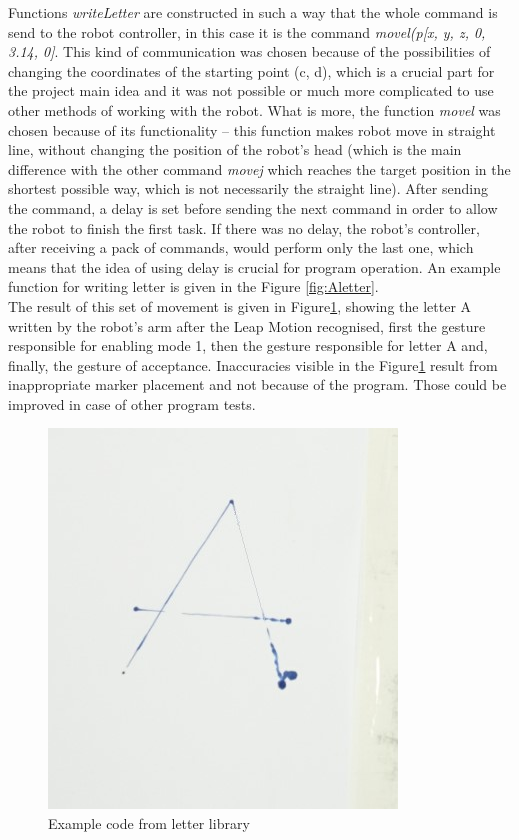Functions \textit{writeLetter} are constructed in such a way that the whole command is send to the robot controller, in this case it is the command \textit{movel(p[x, y, z, 0, 3.14, 0]}. This kind of communication was chosen because of the possibilities of changing the coordinates of the starting point (c, d), which is a crucial part for the project main idea and it was not possible or much more complicated to use other methods of working with the robot. What is more, the function \textit{movel} was chosen because of its functionality – this function makes robot move in straight line, without changing the position of the robot’s head (which is the main difference with the other command \textit{movej} which reaches the target position in the shortest possible way, which is not necessarily the straight line). After sending the command, a delay is set before sending the next command in order to allow the robot to finish the first task. If there was no delay, the robot’s controller, after receiving a pack of commands, would perform only the last one, which means that the idea of using delay is crucial for program operation. An example function for writing letter is given in the Figure \ref{fig:Aletter}. \\

The result of this set of movement is given in Figure\ref{fig:letter}, showing the letter A written by the robot’s arm after the Leap Motion recognised, first the gesture responsible for enabling mode 1, then the gesture responsible for letter A and, finally, the gesture of acceptance. Inaccuracies visible in the Figure\ref{fig:letter} result from inappropriate marker placement and not because of the program. Those could be improved in case of other program tests. \\

\begin{figure}[H]
	\includegraphics{letter}
	\centering
	\caption{Example code from letter library}
	\label{fig:letter}
\end{figure}

